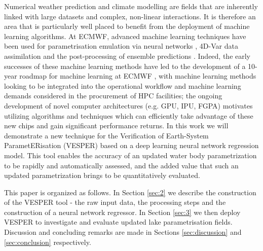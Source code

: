 \documentclass[hess, twostagejnl]{copernicus}
\begin{document}
\noindent Numerical weather prediction and climate modelling are fields that are inherently linked with large datasets and complex, non-linear interactions. It is therefore an area that is particularly well placed to benefit from the deployment of machine learning algorithms. At ECMWF, advanced machine learning techniques have been used for parametrisation emulation via neural networks \citep{Chantry2021}, 4D-Var data assimilation \citep{Hatfield2021} and the post-processing of ensemble predictions \citep{Hewson2021}. Indeed, the early successes of these machine learning methods have led to the development of a 10-year roadmap for machine learning at ECMWF \citep{p19877}, with machine learning methods looking to be integrated into the operational workflow and machine learning demands considered in the procurement of HPC facilities; the ongoing development of novel computer architectures (e.g. GPU, IPU, FGPA) motivates utilizing algorithms and techniques which can efficiently take advantage of these new chips and gain significant performance returns. In this work we will demonstrate a new technique for the Verification of Earth-System ParametERisation (VESPER) based on a deep learning neural network regression model. This tool enables the accuracy of an updated water body parametrization to be rapidly and automatically assessed, and the added value that such an updated parametrization brings to be quantitatively evaluated. \newline 


\noindent This paper is organized as follows. In Section \ref{sec:2} we describe the construction of the VESPER tool - the raw input data, the processing steps and the construction of a neural network regressor. In Section \ref{sec:3} we then deploy VESPER to investigate and evaluate updated lake parametrisation fields. Discussion and concluding remarks are made in Sections \ref{sec:discussion} and \ref{sec:conclusion} respectively. 
\end{document}
